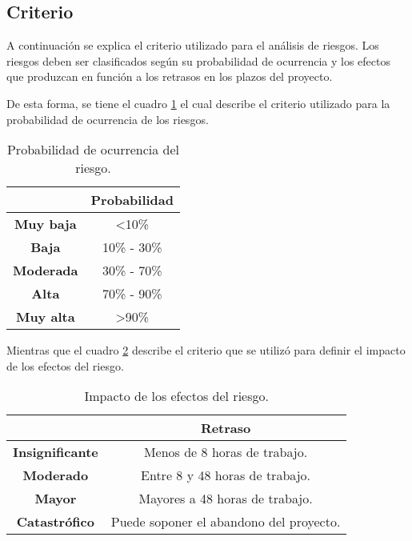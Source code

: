 \subsection{Criterio}
A continuación se explica el criterio utilizado para el análisis de riesgos. Los riesgos deben ser clasificados según su probabilidad de ocurrencia y los efectos que produzcan en función a los retrasos en los plazos del proyecto. 

De esta forma, se tiene el cuadro \ref{tab:probabilidad_riesgo} el cual describe el criterio utilizado para la probabilidad de ocurrencia de los riesgos.

\begin{table}[H]
  \centering
  \begin{tabular}{|c|c|}
  \hline
                    & \textbf{Probabilidad} \\ \hline
  \textbf{Muy baja} & \textless 10\%        \\ \hline
  \textbf{Baja}     & 10\% - 30\%           \\ \hline
  \textbf{Moderada} & 30\% - 70\%           \\ \hline
  \textbf{Alta}     & 70\% - 90\%           \\ \hline
  \textbf{Muy alta} & \textgreater 90\%     \\ \hline
  \end{tabular}
  \caption{Probabilidad de ocurrencia del riesgo.}
  \label{tab:probabilidad_riesgo}
  \end{table}

Mientras que el cuadro \ref{tab:efectos_riesgo} describe el criterio que se utilizó para definir el impacto de los efectos del riesgo. 

\begin{table}[H]
  \centering
  \begin{tabular}{|c|c|}
  \hline
                        & \textbf{Retraso}                        \\ \hline
  \textbf{Insignificante} & Menos de 8 horas de trabajo.            \\ \hline
  \textbf{Moderado}     & Entre 8 y 48 horas de trabajo.          \\ \hline
  \textbf{Mayor}        & Mayores a 48 horas de trabajo.          \\ \hline
  \textbf{Catastrófico}      & Puede soponer el abandono del proyecto. \\ \hline
  \end{tabular}
  \caption{Impacto de los efectos del riesgo.}
  \label{tab:efectos_riesgo}
  \end{table}

